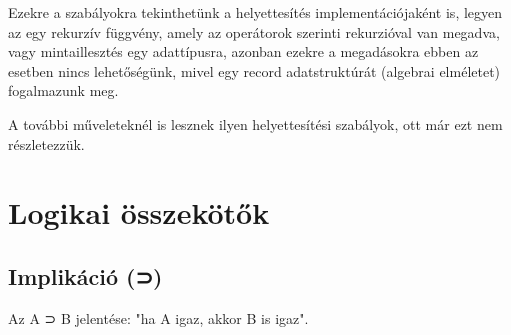 Ezekre a szabályokra tekinthetünk a helyettesítés implementációjaként is, legyen az egy rekurzív függvény, amely az operátorok szerinti rekurzióval van megadva, vagy mintaillesztés egy adattípusra, azonban ezekre a megadásokra ebben az esetben nincs lehetőségünk, mivel egy record adatstruktúrát (algebrai elméletet) fogalmazunk meg.

A további műveleteknél is lesznek ilyen helyettesítési szabályok, ott már ezt nem részletezzük.

\section{Logikai összekötők}

\subsection{Implikáció (⊃)}

Az A ⊃ B jelentése: "ha A igaz, akkor B is igaz".
\begin{code}%
%
\>[6]%
\>[12]\AgdaSymbol{:}\AgdaSpace{}%
\AgdaSymbol{\}}\AgdaSpace{}%
\AgdaSpace{}%
\AgdaSpace{}%
\AgdaSpace{}%
\AgdaSpace{}%
\AgdaSpace{}%
\AgdaSpace{}%
\AgdaSpace{}%
\AgdaSpace{}%
\<%
\end{code}

